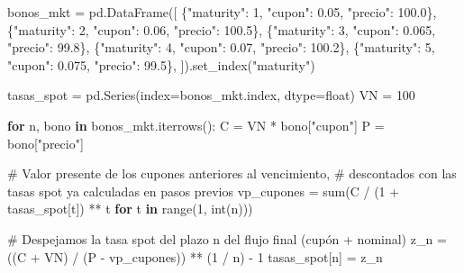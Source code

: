 \documentclass[
  spanish,
  letterpaper,
  DIV=11,
  numbers=noendperiod]{scrreprt}
\newenvironment{Shaded}{\begin{snugshade}}{\end{snugshade}}
\newcommand{\BuiltInTok}[1]{\textcolor[rgb]{0.00,0.23,0.31}{#1}}
\newcommand{\CommentTok}[1]{\textcolor[rgb]{0.37,0.37,0.37}{#1}}
\newcommand{\ControlFlowTok}[1]{\textcolor[rgb]{0.00,0.23,0.31}{\textbf{#1}}}
\newcommand{\DecValTok}[1]{\textcolor[rgb]{0.68,0.00,0.00}{#1}}
\newcommand{\FloatTok}[1]{\textcolor[rgb]{0.68,0.00,0.00}{#1}}
\newcommand{\KeywordTok}[1]{\textcolor[rgb]{0.00,0.23,0.31}{\textbf{#1}}}
\newcommand{\NormalTok}[1]{\textcolor[rgb]{0.00,0.23,0.31}{#1}}
\newcommand{\OperatorTok}[1]{\textcolor[rgb]{0.37,0.37,0.37}{#1}}
\newcommand{\StringTok}[1]{\textcolor[rgb]{0.13,0.47,0.30}{#1}}
\begin{document}
\label{bootstrapping-final}
\begin{Shaded}
\begin{Highlighting}[]
\NormalTok{bonos\_mkt }\OperatorTok{=}\NormalTok{ pd.DataFrame([}
\NormalTok{    \{}\StringTok{"maturity"}\NormalTok{: }\DecValTok{1}\NormalTok{, }\StringTok{"cupon"}\NormalTok{: }\FloatTok{0.05}\NormalTok{, }\StringTok{"precio"}\NormalTok{: }\FloatTok{100.0}\NormalTok{\},}
\NormalTok{    \{}\StringTok{"maturity"}\NormalTok{: }\DecValTok{2}\NormalTok{, }\StringTok{"cupon"}\NormalTok{: }\FloatTok{0.06}\NormalTok{, }\StringTok{"precio"}\NormalTok{: }\FloatTok{100.5}\NormalTok{\},}
\NormalTok{    \{}\StringTok{"maturity"}\NormalTok{: }\DecValTok{3}\NormalTok{, }\StringTok{"cupon"}\NormalTok{: }\FloatTok{0.065}\NormalTok{, }\StringTok{"precio"}\NormalTok{: }\FloatTok{99.8}\NormalTok{\},}
\NormalTok{    \{}\StringTok{"maturity"}\NormalTok{: }\DecValTok{4}\NormalTok{, }\StringTok{"cupon"}\NormalTok{: }\FloatTok{0.07}\NormalTok{, }\StringTok{"precio"}\NormalTok{: }\FloatTok{100.2}\NormalTok{\},}
\NormalTok{    \{}\StringTok{"maturity"}\NormalTok{: }\DecValTok{5}\NormalTok{, }\StringTok{"cupon"}\NormalTok{: }\FloatTok{0.075}\NormalTok{, }\StringTok{"precio"}\NormalTok{: }\FloatTok{99.5}\NormalTok{\},}
\NormalTok{]).set\_index(}\StringTok{"maturity"}\NormalTok{)}

\NormalTok{tasas\_spot }\OperatorTok{=}\NormalTok{ pd.Series(index}\OperatorTok{=}\NormalTok{bonos\_mkt.index, dtype}\OperatorTok{=}\BuiltInTok{float}\NormalTok{)}
\NormalTok{VN }\OperatorTok{=} \DecValTok{100}

\ControlFlowTok{for}\NormalTok{ n, bono }\KeywordTok{in}\NormalTok{ bonos\_mkt.iterrows():}
\NormalTok{    C }\OperatorTok{=}\NormalTok{ VN }\OperatorTok{*}\NormalTok{ bono[}\StringTok{"cupon"}\NormalTok{]}
\NormalTok{    P }\OperatorTok{=}\NormalTok{ bono[}\StringTok{"precio"}\NormalTok{]}

    \CommentTok{\# Valor presente de los cupones anteriores al vencimiento,}
    \CommentTok{\# descontados con las tasas spot ya calculadas en pasos previos}
\NormalTok{    vp\_cupones }\OperatorTok{=} \BuiltInTok{sum}\NormalTok{(C }\OperatorTok{/}\NormalTok{ (}\DecValTok{1} \OperatorTok{+}\NormalTok{ tasas\_spot[t]) }\OperatorTok{**}\NormalTok{ t }\ControlFlowTok{for}\NormalTok{ t }\KeywordTok{in} \BuiltInTok{range}\NormalTok{(}\DecValTok{1}\NormalTok{, }\BuiltInTok{int}\NormalTok{(n)))}

    \CommentTok{\# Despejamos la tasa spot del plazo n del flujo final (cupón + nominal)}
\NormalTok{    z\_n }\OperatorTok{=}\NormalTok{ ((C }\OperatorTok{+}\NormalTok{ VN) }\OperatorTok{/}\NormalTok{ (P }\OperatorTok{{-}}\NormalTok{ vp\_cupones)) }\OperatorTok{**}\NormalTok{ (}\DecValTok{1} \OperatorTok{/}\NormalTok{ n) }\OperatorTok{{-}} \DecValTok{1}
\NormalTok{    tasas\_spot[n] }\OperatorTok{=}\NormalTok{ z\_n}


\end{Highlighting}
\end{Shaded}
\end{document}
